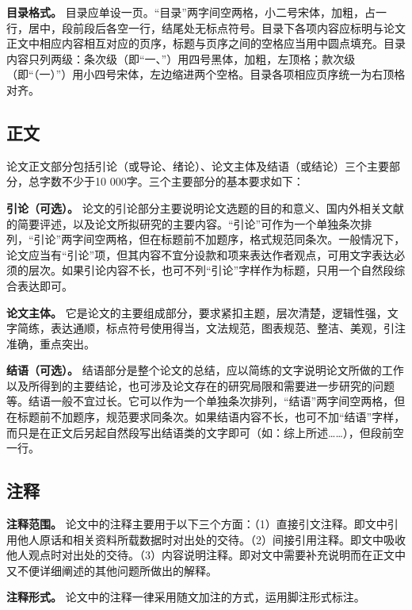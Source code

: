 \documentclass[doublesided]{Style/ucasthesis}%
\begin{document}
\textbf{目录格式。} 目录应单设一页。``目录''两字间空两格，小二号宋体，加粗，占一行，居中，段前段后各空一行，结尾处无标点符号。目录下各项内容应标明与论文正文中相应内容相互对应的页序，标题与页序之间的空格应当用中圆点填充。目录内容只列两级：条次级（即``一、''）用四号黑体，加粗，左顶格；款次级（即``（一）''）用小四号宋体，左边缩进两个空格。目录各项相应页序统一为右顶格对齐。

\hypertarget{section-20}{%
\subsection{正文}\label{section-20}}

论文正文部分包括引论（或导论、绪论）、论文主体及结语（或结论）三个主要部分，总字数不少于10 000字。三个主要部分的基本要求如下：

\textbf{引论（可选）。} 论文的引论部分主要说明论文选题的目的和意义、国内外相关文献的简要评述，以及论文所拟研究的主要内容。``引论''可作为一个单独条次排列，``引论''两字间空两格，但在标题前不加题序，格式规范同条次。一般情况下，论文应当有``引论''项，但其内容不宜分设款和项来表达作者观点，可用文字表达必须的层次。如果引论内容不长，也可不列``引论''字样作为标题，只用一个自然段综合表达即可。

\textbf{论文主体。} 它是论文的主要组成部分，要求紧扣主题，层次清楚，逻辑性强，文字简练，表达通顺，标点符号使用得当，文法规范，图表规范、整洁、美观，引注准确，重点突出。

\textbf{结语（可选）。} 结语部分是整个论文的总结，应以简练的文字说明论文所做的工作以及所得到的主要结论，也可涉及论文存在的研究局限和需要进一步研究的问题等。结语一般不宜过长。它可以作为一个单独条次排列，``结语''两字间空两格，但在标题前不加题序，规范要求同条次。如果结语内容不长，也可不加``结语''字样，而只是在正文后另起自然段写出结语类的文字即可（如：综上所述\ldots{}\ldots{}），但段前空一行。

\hypertarget{section-21}{%
\subsection{注释}\label{section-21}}

\textbf{注释范围。} 论文中的注释主要用于以下三个方面：（1）直接引文注释。即文中引用他人原话和相关资料所载数据时对出处的交待。（2）间接引用注释。即文中吸收他人观点时对出处的交待。（3）内容说明注释。即对文中需要补充说明而在正文中又不便详细阐述的其他问题所做出的解释。

\textbf{注释形式。} 论文中的注释一律采用随文加注的方式，运用脚注形式标注。
\end{document}
